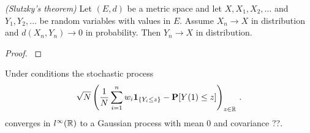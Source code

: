 \begin{theorem}
  \emph{(Slutzky's theorem)}
  Let
  $
  (E,d)
  $
  be a metric space 
  and let
  $X,X_1,X_2,\ldots$
  and
  $Y_1,Y_2,\ldots$
  be random variables with values in $E$.
  Assume
  $X_n\to X$ in distribution and 
  $d(X_n,Y_n)\to 0$ in probability. Then 
  $Y_n\to X$ in distribution.
\end{theorem}
\begin{proof}
  \cite[Theorem~13.8]{Klenke2020}
\end{proof}

\begin{ftheorem}
  Under conditions 
the stochastic process
\begin{gather}
    \sqrt{N}
    \left( 
  \frac{1}{N}
    \sum_{i=1}^{n} 
    w_i
    \mathbf{1}
    _{\left\{ Y_i\le z \right\}}
    -
    \mathbf{P}[Y(1)\le z]
    \right)
    _{z\in\mathbb{R}}
    \,.
  \end{gather}
  converges in
  $l^\infty(\mathbb{R})$
  to a Gaussian process with mean 0 and covariance ??.
\end{ftheorem}
